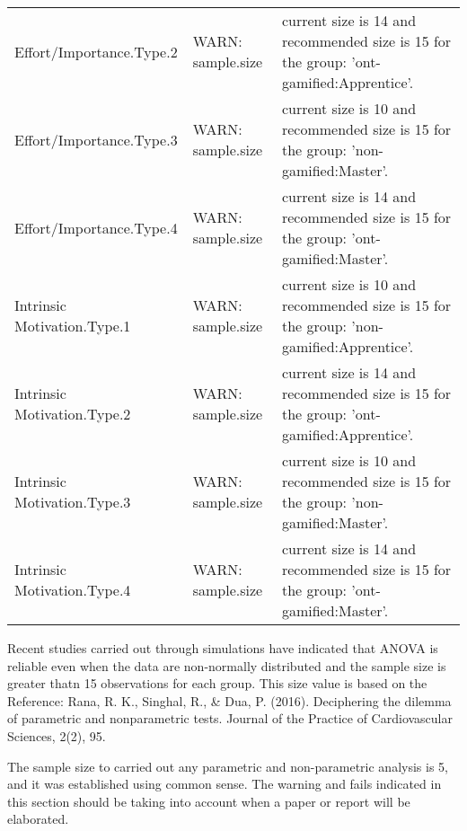 \documentclass[6pt,a4paper]{article}
\begin{document}
{\begin{longtable}{lll}
Effort/Importance.Type.2&WARN: sample.size&current size is 14 and recommended size is 15 for the group: 'ont-gamified:Apprentice'.\tabularnewline
Effort/Importance.Type.3&WARN: sample.size&current size is 10 and recommended size is 15 for the group: 'non-gamified:Master'.\tabularnewline
Effort/Importance.Type.4&WARN: sample.size&current size is 14 and recommended size is 15 for the group: 'ont-gamified:Master'.\tabularnewline
Intrinsic Motivation.Type.1&WARN: sample.size&current size is 10 and recommended size is 15 for the group: 'non-gamified:Apprentice'.\tabularnewline
Intrinsic Motivation.Type.2&WARN: sample.size&current size is 14 and recommended size is 15 for the group: 'ont-gamified:Apprentice'.\tabularnewline
Intrinsic Motivation.Type.3&WARN: sample.size&current size is 10 and recommended size is 15 for the group: 'non-gamified:Master'.\tabularnewline
Intrinsic Motivation.Type.4&WARN: sample.size&current size is 14 and recommended size is 15 for the group: 'ont-gamified:Master'.\tabularnewline
\hline
\end{longtable}}

Recent studies carried out through simulations have indicated that ANOVA is reliable even when the data are non-normally distributed and the sample size is greater thatn 15 observations for each group.
This size value is based on the Reference:
Rana, R. K., Singhal, R., \& Dua, P. (2016). Deciphering the dilemma of parametric and nonparametric tests. Journal of the Practice of Cardiovascular Sciences, 2(2), 95.

The sample size to carried out any parametric and non-parametric analysis is 5, and it was established using common sense.
The warning and fails indicated in this section should be taking into account when a paper or report will be elaborated.
\end{document}
